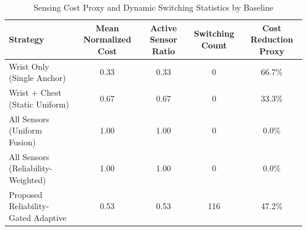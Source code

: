 \begin{table}[htbp]
\caption{Sensing Cost Proxy and Dynamic Switching Statistics by Baseline}
\label{tab:sensing_cost}
\centering
\begin{tabular}{lcccc}
\hline
Strategy & Mean Normalized Cost & Active Sensor Ratio & Switching Count & Cost Reduction Proxy \\ \hline
Wrist Only (Single Anchor) & 0.33 & 0.33 & 0 & 66.7\% \\
Wrist + Chest (Static Uniform) & 0.67 & 0.67 & 0 & 33.3\% \\
All Sensors (Uniform Fusion) & 1.00 & 1.00 & 0 & 0.0\% \\
All Sensors (Reliability-Weighted) & 1.00 & 1.00 & 0 & 0.0\% \\
Proposed Reliability-Gated Adaptive & 0.53 & 0.53 & 116 & 47.2\% \\
\hline
\end{tabular}
\end{table}
